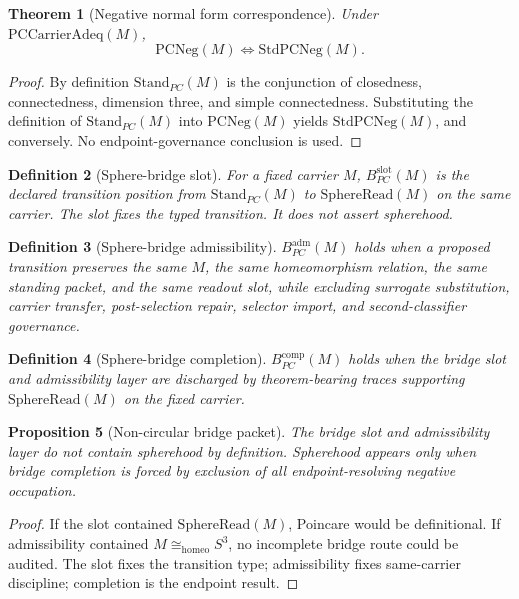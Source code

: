 \documentclass[11pt]{article}
\newtheorem{theorem}{Theorem}[section]
\newtheorem{proposition}[theorem]{Proposition}
\newtheorem{definition}[theorem]{Definition}
\newcommand{\Sthree}{S^{3}}
\newcommand{\StandPC}{\mathrm{Stand}_{PC}}
\newcommand{\SphereRead}{\mathrm{SphereRead}}
\newcommand{\PCNeg}{\mathrm{PCNeg}}
\newcommand{\StdPCNeg}{\mathrm{StdPCNeg}}
\newcommand{\BridgeSlotPC}{B^{\mathrm{slot}}_{PC}}
\newcommand{\BridgeCompPC}{B^{\mathrm{comp}}_{PC}}
\newcommand{\Homeo}{\cong_{\mathrm{homeo}}}
\begin{document}
\begin{theorem}[Negative normal form correspondence]\label{thm:pcneg-normal-form}
Under \(\mathrm{PCCarrierAdeq}(M)\),
\[
\PCNeg(M)\Longleftrightarrow \StdPCNeg(M).
\]
\end{theorem}
\begin{proof}
By definition \(\StandPC(M)\) is the conjunction of closedness, connectedness, dimension three, and simple connectedness. Substituting the definition of \(\StandPC(M)\) into \(\PCNeg(M)\) yields \(\StdPCNeg(M)\), and conversely. No endpoint-governance conclusion is used.
\end{proof}

\begin{definition}[Sphere-bridge slot]
For a fixed carrier \(M\), \(\BridgeSlotPC(M)\) is the declared transition position from \(\StandPC(M)\) to \(\SphereRead(M)\) on the same carrier. The slot fixes the typed transition. It does not assert spherehood.
\end{definition}

\begin{definition}[Sphere-bridge admissibility]
\(B^{\mathrm{adm}}_{PC}(M)\) holds when a proposed transition preserves the same \(M\), the same homeomorphism relation, the same standing packet, and the same readout slot, while excluding surrogate substitution, carrier transfer, post-selection repair, selector import, and second-classifier governance.
\end{definition}

\begin{definition}[Sphere-bridge completion]
\(\BridgeCompPC(M)\) holds when the bridge slot and admissibility layer are discharged by theorem-bearing traces supporting \(\SphereRead(M)\) on the fixed carrier.
\end{definition}

\begin{proposition}[Non-circular bridge packet]\label{prop:bridge-noncircular}
The bridge slot and admissibility layer do not contain spherehood by definition. Spherehood appears only when bridge completion is forced by exclusion of all endpoint-resolving negative occupation.
\end{proposition}
\begin{proof}
If the slot contained \(\SphereRead(M)\), Poincare would be definitional. If admissibility contained \(M\Homeo\Sthree\), no incomplete bridge route could be audited. The slot fixes the transition type; admissibility fixes same-carrier discipline; completion is the endpoint result.
\end{proof}
\end{document}
